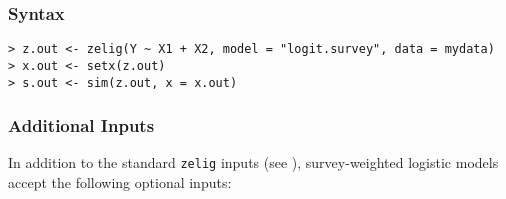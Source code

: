 \subsubsection{Syntax}

\begin{verbatim}
> z.out <- zelig(Y ~ X1 + X2, model = "logit.survey", data = mydata)
> x.out <- setx(z.out)
> s.out <- sim(z.out, x = x.out)
\end{verbatim}


\subsubsection{Additional Inputs}

In addition to the standard {\tt zelig} inputs (see
), survey-weighted logistic models accept the following
optional inputs:
